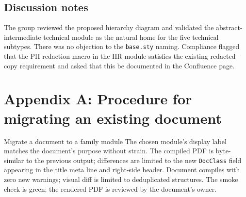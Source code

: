 \documentclass[11pt]{article}
\begin{document}
\subsection*{Discussion notes}

The group reviewed the proposed hierarchy diagram and validated the
abstract-intermediate technical module as the natural home for the five
technical subtypes. There was no objection to the
\texttt{base.sty} naming. Compliance flagged that the PII
redaction macro in the HR module satisfies the existing redacted-copy
requirement and asked that this be documented in the Confluence page.

\section*{Appendix A: Procedure for migrating an existing document}

\begin{procedure}{Migrate a document to a family module}
        {The chosen module's display label matches the document's
         purpose without strain.}
        {The compiled PDF is byte-similar to the previous output;
         differences are limited to the new \texttt{DocClass} field
         appearing in the title meta line and right-side header.}
        {Document compiles with zero new warnings; visual diff is limited
         to deduplicated structures.}
        {The smoke check is green; the rendered PDF is reviewed by the
         document's owner.}
\end{procedure}
\end{document}
